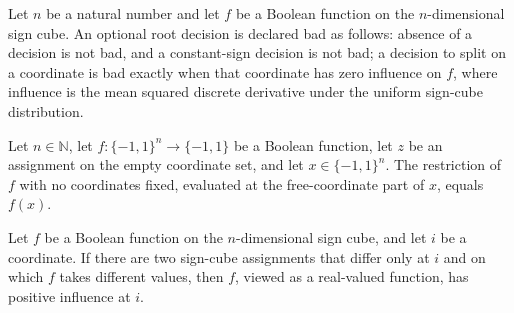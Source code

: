 \begin{definition}
\label{FABL.LowDegreeJuntaRootFinderBad}
\leanok
{}
Let $n$ be a natural number and let $f$ be a Boolean function on the $n$-dimensional
sign cube. An optional root decision is declared bad as follows: absence of a decision
is not bad, and a constant-sign decision is not bad; a decision to split on a coordinate
is bad exactly when that coordinate has zero influence on $f$, where influence is the
mean squared discrete derivative under the uniform sign-cube distribution.
\end{definition}

\begin{theorem}
\label{FABL.juntaRestriction_empty_juntaFreePart}
\leanok
{}
Let $n\in\mathbb{N}$, let $f:\{−1,1\}^n\to\{−1,1\}$ be a Boolean function, let $z$ be an
assignment on the empty coordinate set, and let $x\in\{−1,1\}^n$. The restriction of $f$
with no coordinates fixed, evaluated at the free-coordinate part of $x$, equals $f(x)$.
\end{theorem}

\begin{theorem}
\label{FABL.isRelevant_of_isRelevantJuntaRestriction_empty}
\leanok
{}
Let $f$ be a Boolean function on the $n$-dimensional sign cube, and let $i$ be a
coordinate. If there are two sign-cube assignments that differ only at $i$ and on which
$f$ takes different values, then $f$, viewed as a real-valued function, has positive
influence at $i$.
\end{theorem}

